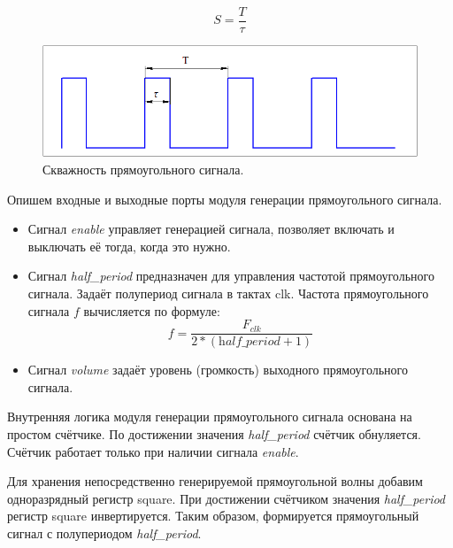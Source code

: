 $$ S = \frac{T}{\tau} $$


\begin{figure}[H]
	\centering
	\includegraphics [width=1\textwidth] {images/lab_7/duty_cycle.png}
	\caption{Скважность прямоугольного сигнала.}
	\label{lab7:pic4}
\end{figure}


Опишем входные и выходные порты модуля генерации прямоугольного сигнала.

\noindent
\begin{minipage}{\linewidth}
	
\end{minipage}

\begin{itemize}
	\item Сигнал \textit{enable} управляет генерацией сигнала, позволяет включать и выключать её тогда, когда это нужно.
	\item Сигнал \textit{half\_period} предназначен для управления частотой прямоугольного сигнала. Задаёт полупериод сигнала в тактах clk. Частота прямоугольного сигнала $f$ вычисляется по формуле: 
	$$ f = \frac{F_{clk}}{2* (\textit{half\_period} + 1)} $$
	\item Сигнал \textit{volume} задаёт уровень (громкость) выходного прямоугольного сигнала.

\end{itemize}


Внутренняя логика модуля генерации прямоугольного сигнала основана на простом счётчике. По достижении значения \textit{half\_period} счётчик обнуляется. Счётчик работает только при наличии сигнала \textit{enable}.

\noindent
\begin{minipage}{\linewidth}
	
\end{minipage}

Для хранения непосредственно генерируемой прямоугольной волны добавим одноразрядный регистр square.
При достижении счётчиком значения \textit{half\_period} регистр square инвертируется. Таким образом, формируется прямоугольный сигнал с полупериодом \textit{half\_period}.

